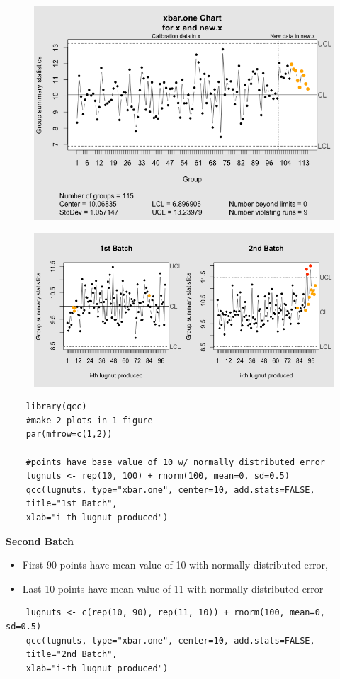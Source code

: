 \documentclass[MASTER-SPC.tex]{subfiles}
\begin{document}
\begin{figure}[h!]
	\centering
	\includegraphics[width=0.9\linewidth]{./qcc-yhatexample}
	\caption{}
	\label{fig:qcc-yhatexample}
\end{figure}
\bigskip
\newpage
\begin{figure}[h!]
	\centering
	\includegraphics[width=0.90\linewidth]{./qcc_lugnuts1}
	
	\label{fig:qcc_lugnuts1}
\end{figure}
\begin{framed}
	\begin{verbatim}
	library(qcc)
	#make 2 plots in 1 figure
	par(mfrow=c(1,2))
	
	#points have base value of 10 w/ normally distributed error
	lugnuts <- rep(10, 100) + rnorm(100, mean=0, sd=0.5)
	qcc(lugnuts, type="xbar.one", center=10, add.stats=FALSE,
	title="1st Batch", 
	xlab="i-th lugnut produced")
	\end{verbatim}
\end{framed} 
\newpage
{
	\large
	\textbf{Second Batch }
	\begin{itemize}
		\item First 90 points have mean value of 10 with normally distributed error,
		\item Last 10 points have mean value of 11 with normally distributed error
	\end{itemize}
}
\begin{framed}
	\begin{verbatim}
	lugnuts <- c(rep(10, 90), rep(11, 10)) + rnorm(100, mean=0, sd=0.5)
	qcc(lugnuts, type="xbar.one", center=10, add.stats=FALSE,
	title="2nd Batch", 
	xlab="i-th lugnut produced")
	
	\end{verbatim}
\end{framed}
\newpage 
\end{document}
